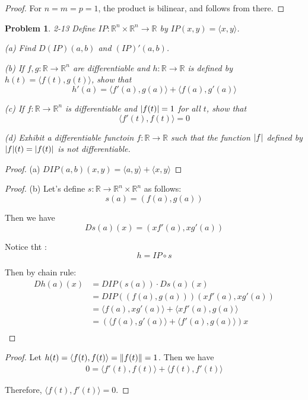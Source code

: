 \documentclass[12pt]{book}
\newcommand\T{\rule{0pt}{2.6ex}}
\newcommand\B{\rule[-1.2ex]{0pt}{0pt}}
\newtheorem*{problem*}{Problem}
\newcommand{\ipp}[2]{\langle #1, #2 \rangle}
\begin{document}
\begin{proof}
  For $n = m = p = 1$, the product is bilinear, and follows from there. 
\end{proof}

\begin{problem*}
  2-13 Define $IP : \mathbb{R}^n \times \mathbb{R}^n \to \mathbb{R}$ by $IP(x,y) = \langle x, y \rangle$.

  \T\B (a) Find $D(IP)(a,b)$ and $(IP)'(a,b)$.

  \T\B (b) If $f,g : \mathbb{R} \to \mathbb{R}^n$ are differentiable and $h : \mathbb{R} \to \mathbb{R}$ is defined by $h(t) = \langle f(t), g(t) \rangle$, show that
  \[
  h'(a) = \langle f'(a), g(a)\rangle + \langle f(a), g'(a)\rangle
  \]

  \T\B (c) If $f : \mathbb{R} \to \mathbb{R}^n$ is differentiable and $\abs{f(t)} = 1$ for all $t$, show that
  \[
  \langle f'(t), f(t) \rangle = 0
  \]

  \T\B (d) Exhibit a differentiable functoin $f : \mathbb{R} \to \mathbb{R}$ such that the function $\abs{f}$ defined by $\abs{f}(t) = \abs{f(t)}$ is not differentiable. 
\end{problem*}

\begin{proof}
  (a) $DIP(a,b)(x,y) = \ipp{a}{y} + \ipp{x}{y}$
\end{proof}

\begin{proof}
  (b) Let's define $s: \mathbb{R} \to \mathbb{R}^n  \times \mathbb{R}^n$ as follows:
  \[
  s(a) = (f(a), g(a))
  \]

  Then we have
  \[
  Ds(a)(x) = (xf'(a), xg'(a))
  \]

  Notice tht :
  \[
  h = IP \circ s
  \]

  Then by chain rule:
  \begin{align*}
    Dh(a)(x) &= DIP(s(a))\cdot Ds(a)(x) \\
    &= DIP((f(a), g(a)))(xf'(a), xg'(a)) \\
    &= \ipp{f(a)}{xg'(a)} + \ipp{xf'(a)}{g(a)}\\
    &= \left(\ipp{f(a)}{g'(a)} + \ipp{f'(a)}{g(a)}\right) x\\
  \end{align*}
\end{proof}

\begin{proof}
  Let $h(t) = \ipp{f(t)}{f(t)} = \norm{f(t)} = 1$. Then we have
  \begin{align*}
    0 = \ipp{f'(t)}{f(t)} + \ipp{f(t)}{f'(t)}
  \end{align*}

  Therefore, $\ipp{f(t)}{f'(t)} = 0$.
\end{proof}
\end{document}
